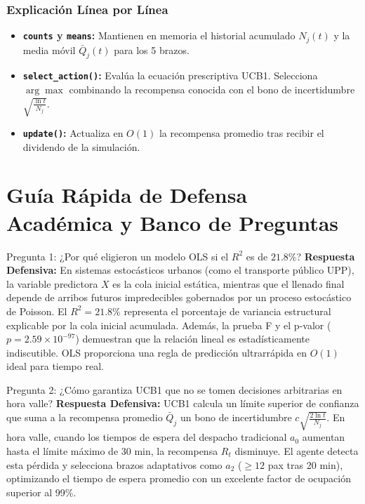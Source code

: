\documentclass[12pt,letterpaper]{article}
\begin{document}
\subsubsection{Explicación Línea por Línea}
\begin{itemize}
	\item \textbf{\texttt{counts} y \texttt{means}:} Mantienen en memoria el historial acumulado $N_j(t)$ y la media móvil $\bar{Q}_j(t)$ para los 5 brazos.
	\item \textbf{\texttt{select\_action()}:} Evalúa la ecuación prescriptiva UCB1. Selecciona $\arg\max$ combinando la recompensa conocida con el bono de incertidumbre $\sqrt{\frac{\ln t}{N_j}}$.
	\item \textbf{\texttt{update()}:} Actualiza en $O(1)$ la recompensa promedio tras recibir el dividendo de la simulación.
\end{itemize}

\newpage
\section{Guía Rápida de Defensa Académica y Banco de Preguntas}

\begin{summarybox}{Pregunta 1: ¿Por qué eligieron un modelo OLS si el $R^2$ es de $21.8\%$?}
	\textbf{Respuesta Defensiva:} En sistemas estocásticos urbanos (como el transporte público UPP), la variable predictora $X$ es la cola inicial estática, mientras que el llenado final depende de arribos futuros impredecibles gobernados por un proceso estocástico de Poisson. El $R^2 = 21.8\%$ representa el porcentaje de variancia estructural explicable por la cola inicial acumulada. Además, la prueba F y el p-valor ($p = 2.59 \times 10^{-97}$) demuestran que la relación lineal es estadísticamente indiscutible. OLS proporciona una regla de predicción ultrarrápida en $O(1)$ ideal para tiempo real.
\end{summarybox}

\begin{summarybox}{Pregunta 2: ¿Cómo garantiza UCB1 que no se tomen decisiones arbitrarias en hora valle?}
	\textbf{Respuesta Defensiva:} UCB1 calcula un límite superior de confianza que suma a la recompensa promedio $\bar{Q}_j$ un bono de incertidumbre $c \sqrt{\frac{2 \ln t}{N_j}}$. En hora valle, cuando los tiempos de espera del despacho tradicional $a_0$ aumentan hasta el límite máximo de 30 min, la recompensa $R_t$ disminuye. El agente detecta esta pérdida y selecciona brazos adaptativos como $a_2$ ($\ge 12$ pax tras 20 min), optimizando el tiempo de espera promedio con un excelente factor de ocupación superior al 99\%.
\end{summarybox}
\end{document}
